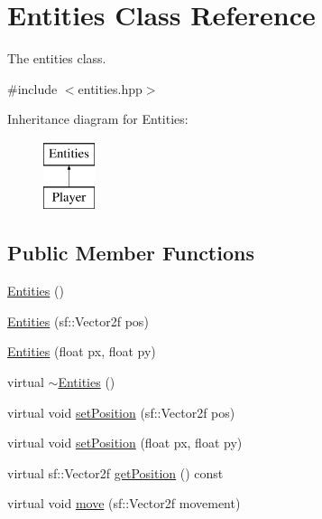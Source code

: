\hypertarget{classEntities}{\section{Entities Class Reference}
\label{classEntities}
}


The entities class.  




{\ttfamily \#include $<$entities.\-hpp$>$}

Inheritance diagram for Entities\-:\begin{figure}[H]
\begin{center}
\leavevmode
\includegraphics[height=2.000000cm]{classEntities}
\end{center}
\end{figure}
\subsection*{Public Member Functions}
\begin{DoxyCompactItemize}
\item 
\hyperlink{classEntities_a0632e3790f40fec4e831800d48ff491b}{Entities} ()
\item 
\hyperlink{classEntities_af131357f6b31e9e9bec551a5afa57dbd}{Entities} (sf\-::\-Vector2f pos)
\item 
\hyperlink{classEntities_a2b523e8705f7a102b466efad8d3162ba}{Entities} (float px, float py)
\item 
virtual \hyperlink{classEntities_ab0c6d116edff7d71de53252e99288825}{$\sim$\-Entities} ()
\item 
virtual void \hyperlink{classEntities_a10bf20192cbd1316f6b743aa2f4344ec}{set\-Position} (sf\-::\-Vector2f pos)
\item 
virtual void \hyperlink{classEntities_a86f93c9f2b2ece831234f274554de431}{set\-Position} (float px, float py)
\item 
virtual sf\-::\-Vector2f \hyperlink{classEntities_a7cf4315e835d2a68b91151f32fddeff7}{get\-Position} () const 
\item 
virtual void \hyperlink{classEntities_a2629ebdd7a4538f9686e812c58c21b41}{move} (sf\-::\-Vector2f movement)
\end{DoxyCompactItemize}



